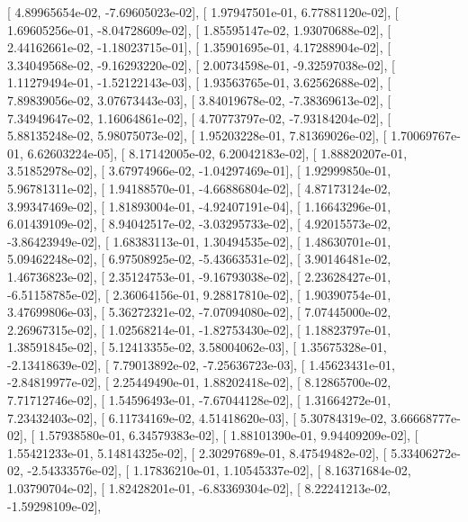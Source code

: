 \documentclass{article}
\begin{document}
       [  4.89965654e-02,  -7.69605023e-02],
       [  1.97947501e-01,   6.77881120e-02],
       [  1.69605256e-01,  -8.04728609e-02],
       [  1.85595147e-02,   1.93070688e-02],
       [  2.44162661e-02,  -1.18023715e-01],
       [  1.35901695e-01,   4.17288904e-02],
       [  3.34049568e-02,  -9.16293220e-02],
       [  2.00734598e-01,  -9.32597038e-02],
       [  1.11279494e-01,  -1.52122143e-03],
       [  1.93563765e-01,   3.62562688e-02],
       [  7.89839056e-02,   3.07673443e-03],
       [  3.84019678e-02,  -7.38369613e-02],
       [  7.34949647e-02,   1.16064861e-02],
       [  4.70773797e-02,  -7.93184204e-02],
       [  5.88135248e-02,   5.98075073e-02],
       [  1.95203228e-01,   7.81369026e-02],
       [  1.70069767e-01,   6.62603224e-05],
       [  8.17142005e-02,   6.20042183e-02],
       [  1.88820207e-01,   3.51852978e-02],
       [  3.67974966e-02,  -1.04297469e-01],
       [  1.92999850e-01,   5.96781311e-02],
       [  1.94188570e-01,  -4.66886804e-02],
       [  4.87173124e-02,   3.99347469e-02],
       [  1.81893004e-01,  -4.92407191e-04],
       [  1.16643296e-01,   6.01439109e-02],
       [  8.94042517e-02,  -3.03295733e-02],
       [  4.92015573e-02,  -3.86423949e-02],
       [  1.68383113e-01,   1.30494535e-02],
       [  1.48630701e-01,   5.09462248e-02],
       [  6.97508925e-02,  -5.43663531e-02],
       [  3.90146481e-02,   1.46736823e-02],
       [  2.35124753e-01,  -9.16793038e-02],
       [  2.23628427e-01,  -6.51158785e-02],
       [  2.36064156e-01,   9.28817810e-02],
       [  1.90390754e-01,   3.47699806e-03],
       [  5.36272321e-02,  -7.07094080e-02],
       [  7.07445000e-02,   2.26967315e-02],
       [  1.02568214e-01,  -1.82753430e-02],
       [  1.18823797e-01,   1.38591845e-02],
       [  5.12413355e-02,   3.58004062e-03],
       [  1.35675328e-01,  -2.13418639e-02],
       [  7.79013892e-02,  -7.25636723e-03],
       [  1.45623431e-01,  -2.84819977e-02],
       [  2.25449490e-01,   1.88202418e-02],
       [  8.12865700e-02,   7.71712746e-02],
       [  1.54596493e-01,  -7.67044128e-02],
       [  1.31664272e-01,   7.23432403e-02],
       [  6.11734169e-02,   4.51418620e-03],
       [  5.30784319e-02,   3.66668777e-02],
       [  1.57938580e-01,   6.34579383e-02],
       [  1.88101390e-01,   9.94409209e-02],
       [  1.55421233e-01,   5.14814325e-02],
       [  2.30297689e-01,   8.47549482e-02],
       [  5.33406272e-02,  -2.54333576e-02],
       [  1.17836210e-01,   1.10545337e-02],
       [  8.16371684e-02,   1.03790704e-02],
       [  1.82428201e-01,  -6.83369304e-02],
       [  8.22241213e-02,  -1.59298109e-02],
\end{document}
